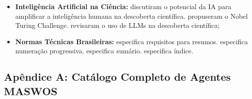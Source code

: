 \begin{itemize}
    \item \textbf{Inteligência Artificial na Ciência:}
     discutiram o potencial da IA para
    amplificar a inteligência humana na descoberta científica.
     propuseram o Nobel Turing
    Challenge.  revisaram
    o uso de LLMs na descoberta científica;

    \item \textbf{Normas Técnicas Brasileiras:}
     especifica requisitos para resumos.
     especifica numeração progressiva.
     especifica sumário.
     especifica índice.
\end{itemize}


\subsection*{Apêndice A: Catálogo Completo de Agentes MASWOS}

